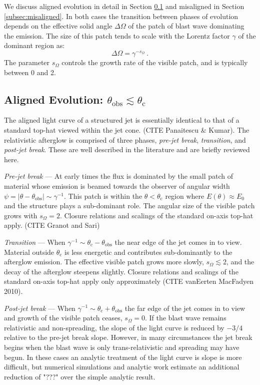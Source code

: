 \documentclass[twocolumn]{aastex62}
\newcommand{\thobs}{\ensuremath{\theta_{\mathrm{obs}}}}
\newcommand{\thC}{\ensuremath{\theta_{\mathrm{c}}}}
\newcommand{\som}{\ensuremath{s_{\Omega}}}
\begin{document}
We discuss aligned evolution in detail in Section \ref{subsec:aligned} and misaligned in Section \ref{subsec:misaligned}.  In both cases the transition between phases of evolution depends on the effective solid angle $\Delta \Omega$ of the patch of blast wave dominating the emission.  The size of this patch tends to scale with the Lorentz factor $\gamma$ of the dominant region as:
\begin{equation}
	\Delta \Omega = \gamma^{-\som} \ .
\end{equation}
The parameter $\som$ controls the growth rate of the visible patch, and is typically between 0 and 2. 

\subsection{Aligned Evolution: $\thobs \lesssim \thC$} \label{subsec:aligned}

The aligned light curve of a structured jet is essentially identical to that of a standard top-hat viewed within the jet cone. (CITE Panaitescu \& Kumar).  The relativistic afterglow is comprised of three phases, \emph{pre-jet break}, \emph{transition}, and \emph{post-jet break}.  These are well described in the literature and are briefly reviewed here.

\emph{Pre-jet break} ---  At early times the flux is dominated by the small patch of material whose emission is beamed towards the observer of angular width $\psi = |\theta-\thobs| \sim \gamma^{-1}$.  This patch is within the $\theta < \thC$ region where $E(\theta) \approx E_0$ and the structure plays a sub-dominant role.  The angular size of the visible patch grows with $\som = 2$.  Closure relations and scalings of the standard on-axis top-hat apply. (CITE Granot and Sari)

\emph{Transition} ---  When $\gamma^{-1} \sim \thC-\thobs$ the near edge of the jet comes in to view.  Material outside $\thC$ is less energetic and contributes sub-dominantly to the afterglow emission.  The effective visible patch grows more slowly, $\som \lesssim 2$, and the decay of the afterglow steepens slightly. Closure relations and scalings of the standard on-axis top-hat apply only approximately (CITE vanEerten MacFadyen 2010).  

\emph{Post-jet break} ---  When $\gamma^{-1} \sim \thC+\thobs$ the far edge of the jet comes in to view and growth of the visible patch ceases, $\som = 0$.  If the blast wave remains relativistic and non-spreading, the slope of the light curve is reduced by $-3/4$ relative to the pre-jet break slope.  However, in many circumstances the jet break begins when the blast wave is only trans-relativistic and spreading may have begun.  In these cases an analytic treatment of the light curve is slope is more difficult, but numerical simulations and analytic work estimate an additional reduction of "???" over the simple analytic result.
\end{document}
